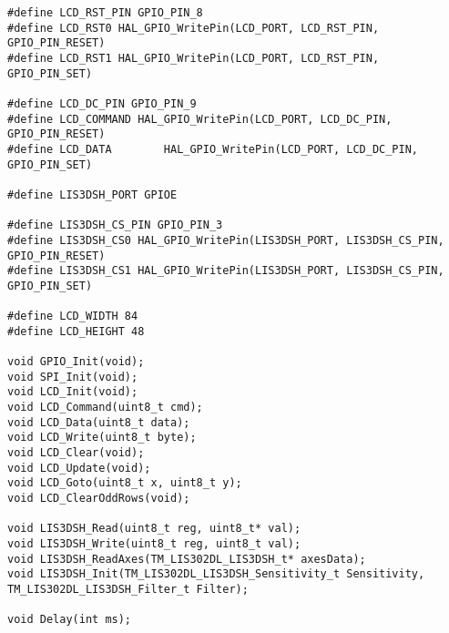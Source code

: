 \documentclass[oneside,14pt]{extarticle}
\begin{document}
\begin{normalsize}
{\begin{lstlisting}
#define LCD_RST_PIN GPIO_PIN_8
#define LCD_RST0 HAL_GPIO_WritePin(LCD_PORT, LCD_RST_PIN, GPIO_PIN_RESET)
#define LCD_RST1 HAL_GPIO_WritePin(LCD_PORT, LCD_RST_PIN, GPIO_PIN_SET)

#define LCD_DC_PIN GPIO_PIN_9
#define LCD_COMMAND HAL_GPIO_WritePin(LCD_PORT, LCD_DC_PIN, GPIO_PIN_RESET)
#define LCD_DATA 		HAL_GPIO_WritePin(LCD_PORT, LCD_DC_PIN, GPIO_PIN_SET)

#define LIS3DSH_PORT GPIOE

#define LIS3DSH_CS_PIN GPIO_PIN_3
#define LIS3DSH_CS0 HAL_GPIO_WritePin(LIS3DSH_PORT, LIS3DSH_CS_PIN, GPIO_PIN_RESET)
#define LIS3DSH_CS1 HAL_GPIO_WritePin(LIS3DSH_PORT, LIS3DSH_CS_PIN, GPIO_PIN_SET)

#define LCD_WIDTH 84
#define LCD_HEIGHT 48

void GPIO_Init(void);
void SPI_Init(void);
void LCD_Init(void);
void LCD_Command(uint8_t cmd);
void LCD_Data(uint8_t data);
void LCD_Write(uint8_t byte);
void LCD_Clear(void);
void LCD_Update(void);
void LCD_Goto(uint8_t x, uint8_t y);
void LCD_ClearOddRows(void);

void LIS3DSH_Read(uint8_t reg, uint8_t* val);
void LIS3DSH_Write(uint8_t reg, uint8_t val);
void LIS3DSH_ReadAxes(TM_LIS302DL_LIS3DSH_t* axesData);
void LIS3DSH_Init(TM_LIS302DL_LIS3DSH_Sensitivity_t Sensitivity, TM_LIS302DL_LIS3DSH_Filter_t Filter);

void Delay(int ms);


\end{lstlisting}}
\end{normalsize}
\end{document}

